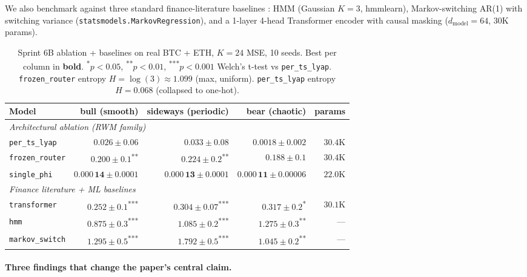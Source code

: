 \documentclass[11pt,a4paper]{article}
\begin{document}
We also benchmark against three standard finance-literature baselines :
HMM (Gaussian $K{=}3$, hmmlearn), Markov-switching AR(1) with
switching variance (\texttt{statsmodels.MarkovRegression}), and a
1-layer 4-head Transformer encoder with causal masking
($d_{\text{model}}{=}64$, 30K params).

\begin{table}[h]
\centering
\caption{Sprint 6B ablation + baselines on real BTC + ETH, $K{=}24$
MSE, 10 seeds. Best per column in \textbf{bold}.
\textsuperscript{*}$p{<}0.05$,
\textsuperscript{**}$p{<}0.01$,
\textsuperscript{***}$p{<}0.001$ Welch's t-test vs
\texttt{per\_ts\_lyap}. \texttt{frozen\_router} entropy
$H{=}\log(3){\approx}1.099$ (max, uniform). \texttt{per\_ts\_lyap}
entropy $H{=}0.068$ (collapsed to one-hot).}
\label{tab:sprint6b}
\begin{tabular}{lrrrr}
\toprule
Model & bull (smooth) & sideways (periodic) & bear (chaotic) & params \\
\midrule
\multicolumn{5}{l}{\textit{Architectural ablation (RWM family)}} \\
\texttt{per\_ts\_lyap}    & $0.026 \pm 0.06$        & $0.033 \pm 0.08$        & $0.0018 \pm 0.002$        & $30.4$K \\
\texttt{frozen\_router}   & $0.200 \pm 0.1$\textsuperscript{**}        & $0.224 \pm 0.2$\textsuperscript{**}        & $0.188 \pm 0.1$        & $30.4$K \\
\texttt{single\_phi}      & $\bm{0.000\,14 \pm 0.0001}$ & $\bm{0.000\,13 \pm 0.0001}$ & $\bm{0.000\,11 \pm 0.00006}$ & $\bm{22.0}$K \\
\midrule
\multicolumn{5}{l}{\textit{Finance literature + ML baselines}} \\
\texttt{transformer}      & $0.252 \pm 0.1$\textsuperscript{***}     & $0.304 \pm 0.07$\textsuperscript{***}    & $0.317 \pm 0.2$\textsuperscript{*}     & $30.1$K \\
\texttt{hmm}              & $0.875 \pm 0.3$\textsuperscript{***}     & $1.085 \pm 0.2$\textsuperscript{***}    & $1.275 \pm 0.3$\textsuperscript{**}    & --- \\
\texttt{markov\_switch}   & $1.295 \pm 0.5$\textsuperscript{***}     & $1.792 \pm 0.5$\textsuperscript{***}    & $1.045 \pm 0.2$\textsuperscript{**}    & --- \\
\bottomrule
\end{tabular}
\end{table}

\paragraph{Three findings that change the paper's central claim.}
\end{document}
